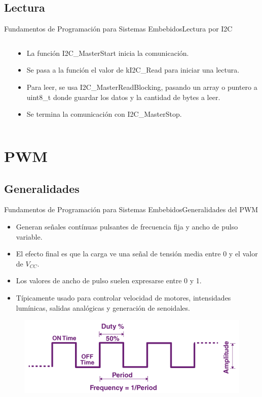 \documentclass[aspectratio=169, xcolor=dvipsnames]{beamer}
\begin{document}
\subsection{Lectura}
\begin{frame}{Fundamentos de Programación para Sistemas Embebidos}{Lectura por I2C}
\begin{columns}
\begin{column}{0.5\textwidth}

\end{column} 
\begin{column}{0.5\textwidth}
\begin{itemize}
    \item La función \textcolor{myblue}{I2C\_MasterStart} inicia la comunicación.
    \item Se pasa a la función el valor de \textcolor{myblue}{kI2C\_Read} para iniciar una lectura.
    \item Para leer, se usa \textcolor{myblue}{I2C\_MasterReadBlocking}, pasando un array o puntero a \textcolor{myblue}{uint8\_t} donde guardar los datos y la cantidad de bytes a leer.
    \item Se termina la comunicación con \textcolor{myblue}{I2C\_MasterStop}.
\end{itemize}
\end{column}
\end{columns}
\end{frame}

\section{PWM}
\subsection{Generalidades}
\begin{frame}{Fundamentos de Programación para Sistemas Embebidos}{Generalidades del PWM}
\begin{itemize}
    \item Generan señales contínuas pulsantes de frecuencia fija y ancho de pulso variable.
    \item El efecto final es que la carga ve una señal de tensión media entre 0 y el valor de $V_{CC}$.
    \item Los valores de ancho de pulso suelen expresarse entre 0 y 1.
    \item Típicamente usado para controlar velocidad de motores, intensidades lumínicas, salidas analógicas y generación de senoidales.
\end{itemize}
\begin{figure}
\centering
\includegraphics[width=0.5\linewidth]{resources/images/pwm.png}
\end{figure}
\end{frame}
\end{document}
